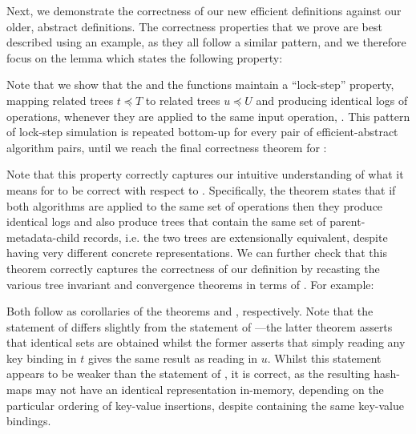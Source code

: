 \documentclass[sigconf]{acmart}
\begin{document}
Next, we demonstrate the correctness of our new efficient definitions against our older, abstract definitions.
The correctness properties that we prove are best described using an example, as they all follow a similar pattern, and we therefore focus on the lemma  which states the following property:


Note that we show that the  and the  functions maintain a ``lock-step'' property, mapping related trees $t \preceq T$ to related trees $u \preceq U$ and producing identical logs of operations, whenever they are applied to the same input operation, .
This pattern of lock-step simulation is repeated bottom-up for every pair of efficient-abstract algorithm pairs, until we reach the final correctness theorem for :


Note that this property correctly captures our intuitive understanding of what it means for  to be correct with respect to .
Specifically, the theorem states that if both algorithms are applied to the same set of operations then they produce identical logs and also produce trees that contain the same set of parent-metadata-child records, i.e. the two trees are extensionally equivalent, despite having very different concrete representations.
We can further check that this theorem correctly captures the correctness of our  definition by recasting the various tree invariant and convergence theorems in terms of .
For example:


Both follow as corollaries of the theorems  and , respectively.
Note that the statement of  differs slightly from the statement of ---the latter theorem asserts that identical sets are obtained whilst the former asserts that simply reading any key binding in $t$ gives the same result as reading in $u$.
Whilst this statement appears to be weaker than the statement of , it is correct, as the resulting hash-maps may not have an identical representation in-memory, depending on the particular ordering of key-value insertions, despite containing the same key-value bindings.
\end{document}
